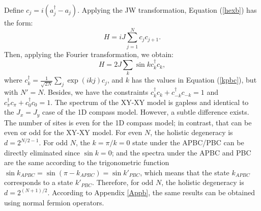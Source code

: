 \documentclass[twocolumn,floats,superscriptaddress]{revtex4}
\begin{document}
 {Define $c_j=i(a_j^\dag-a_j)$. Applying the JW transformation, Equation (\ref{hexb}) has the form:
\begin{equation}\label{hexbma}
H=iJ\sum_{j=1}^{N} c_j c_{j+1}.
\end{equation}
Then, applying the Fourier transformation, we obtain:
\begin{equation}\label{hexbck}
H=2J\sum_{k} \sin k c_k^\dag c_{k},
\end{equation}
where $c_k^\dag=\frac{1}{\sqrt {2N}}\sum_j{\exp{(ikj)}c_{j}}$, and $k$ has the values in Equation (\ref{kpbc}), but with $N'=N$. Besides, we have the constraints $c_k^\dag c_{k}+c_{-k}^\dag c_{-k}=1$ and $c_\pi^\dag c_{\pi}+c_{0}^\dag c_{0}=1$. The spectrum of the XY-XY model is gapless and identical to the $J_x=J_y$ case of the 1D compass model. However, a subtle difference exists. The number of sites is even for the 1D compass model; in contrast, that can be even or odd for the XY-XY model. For even $N$, the holistic degeneracy is $d=2^{N/2-1}$. For odd $N$, the $k=\pi/k=0$ state under the APBC/PBC can be directly eliminated since $\sin k=0$; and the spectra under the APBC and PBC are the same according to the trigonometric function $\sin k_{APBC}=\sin (\pi-k_{APBC})=\sin k'_{PBC}$, which means that the state $k_{APBC}$ corresponds to a state $k'_{PBC}$. Therefore, for odd $N$, the holistic degeneracy is $d=2^{(N+1)/2}$. According to Appendix \ref{Appb}, the same results can be obtained using normal fermion operators.}
\end{document}
